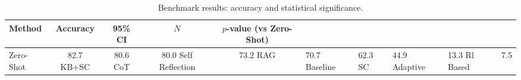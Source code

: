 \begin{table}[t]
\centering
\caption{Benchmark results: accuracy and statistical significance.}
\label{tab:results}
\small
\begin{tabular}{l c c c c}
\toprule
\textbf{Method} & \textbf{Accuracy} & \textbf{95\% CI} & \textbf{$N$} & \textbf{$p$-value (vs Zero-Shot)} \\
\midrule
Zero-Shot & 82.7%
KB+SC & 80.6%
CoT & 80.0%
Self Reflection & 73.2%
RAG & 70.7%
Baseline & 62.3%
SC & 44.9%
Adaptive & 13.3%
Rl Based & 7.5%
\bottomrule
\end{tabular}
\end{table}
